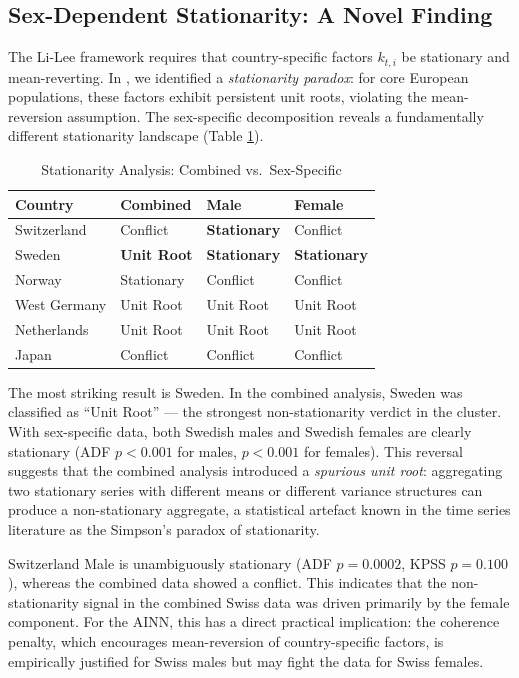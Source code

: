 \documentclass[11pt,a4paper]{article}
\begin{document}
\subsection{Sex-Dependent Stationarity: A Novel Finding}\label{sec:stationarity}

The Li-Lee framework requires that country-specific factors $k_{t,i}$ be stationary and mean-reverting. In \cite{rindori2026p04}, we identified a \textit{stationarity paradox}: for core European populations, these factors exhibit persistent unit roots, violating the mean-reversion assumption. The sex-specific decomposition reveals a fundamentally different stationarity landscape (Table \ref{tab:stationarity}).

\begin{table}[H]
\centering
\caption{Stationarity Analysis: Combined \cite{rindori2026p04} vs.\ Sex-Specific}
\label{tab:stationarity}
\begin{tabular}{@{}llll@{}}
\toprule
Country & Combined \cite{rindori2026p04} & Male & Female \\ \midrule
Switzerland  & Conflict       & \textbf{Stationary} & Conflict \\
Sweden       & \textbf{Unit Root} & \textbf{Stationary} & \textbf{Stationary} \\
Norway       & Stationary     & Conflict            & Conflict \\
West Germany & Unit Root      & Unit Root           & Unit Root \\
Netherlands  & Unit Root      & Unit Root           & Unit Root \\
Japan        & Conflict       & Conflict            & Conflict \\ \bottomrule
\end{tabular}
\end{table}

The most striking result is Sweden. In the combined analysis, Sweden was classified as ``Unit Root'' --- the strongest non-stationarity verdict in the cluster. With sex-specific data, both Swedish males and Swedish females are clearly stationary (ADF $p < 0.001$ for males, $p < 0.001$ for females). This reversal suggests that the combined analysis introduced a \textit{spurious unit root}: aggregating two stationary series with different means or different variance structures can produce a non-stationary aggregate, a statistical artefact known in the time series literature as the Simpson's paradox of stationarity.

Switzerland Male is unambiguously stationary (ADF $p = 0.0002$, KPSS $p = 0.100$), whereas the combined data showed a conflict. This indicates that the non-stationarity signal in the combined Swiss data was driven primarily by the female component. For the AINN, this has a direct practical implication: the coherence penalty, which encourages mean-reversion of country-specific factors, is empirically justified for Swiss males but may fight the data for Swiss females.
\end{document}
